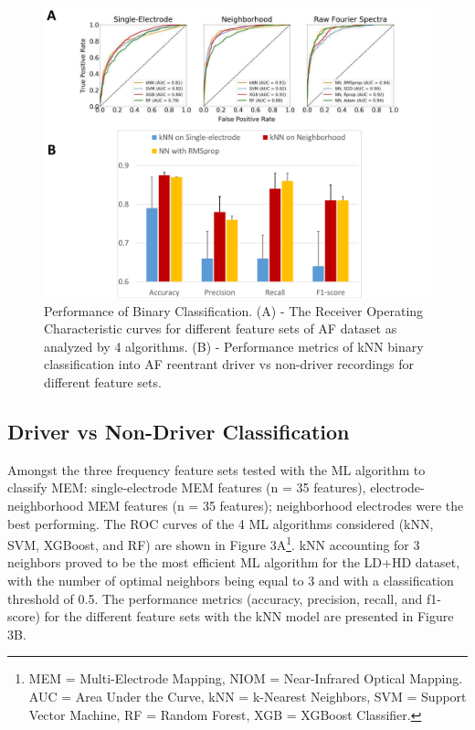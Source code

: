 \documentclass{article}
\begin{document}
\begin{figure}[ht]
\vskip 0.2in
\begin{center}
\centerline{\includegraphics[width=\columnwidth]{image5.pdf}}
\caption{Performance of Binary Classification. (A) - The Receiver Operating Characteristic curves for different feature sets of AF dataset as analyzed by 4 algorithms. (B) - Performance metrics of kNN binary classification into AF reentrant driver vs non-driver recordings for different feature sets.}
\label{icml-historical}
\end{center}
\vskip -0.2in
\end{figure}

\subsection{Driver vs Non-Driver Classification}
Amongst the three frequency feature sets tested with the ML algorithm to classify MEM: single-electrode MEM features (n = 35 features), electrode-neighborhood MEM features (n = 35 features); neighborhood electrodes were the best performing. The ROC curves of the 4 ML algorithms considered (kNN, SVM, XGBoost, and RF) are shown in Figure 3A\footnote{MEM = Multi-Electrode Mapping, NIOM = Near-Infrared Optical Mapping. AUC = Area Under the Curve, kNN = k-Nearest Neighbors, SVM = Support Vector Machine, RF = Random Forest, XGB = XGBoost Classifier.}. kNN accounting for 3 neighbors proved to be the most efficient ML algorithm for the LD+HD dataset, with the number of optimal neighbors being equal to 3 and with a classification threshold of 0.5. The performance metrics (accuracy, precision, recall, and f1-score) for the different feature sets with the kNN model are presented in Figure 3B. 
\end{document}
